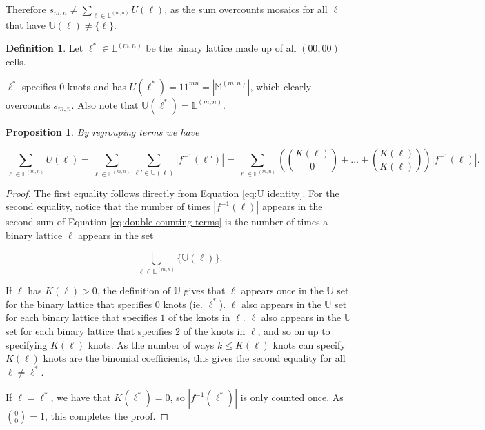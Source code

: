 \documentclass[12pt]{article}
\theoremstyle{plain}
\newtheorem{prop}[thm]{Proposition}
\theoremstyle{definition}
\newtheorem{definition}{Definition}[section]
\theoremstyle{remark}
\theoremstyle{definition}
\begin{document}
Therefore $s_{m,n} \neq \sum_{\ell \in \mathbb{L}^{(m,n)}} U(\ell)$, as the sum overcounts mosaics for all $\ell$ that have $\mathbb{U}(\ell) \neq \{\ell\}$. 

\begin{definition}
    Let $\ell^* \in \mathbb{L}^{(m,n)}$ be the binary lattice made up of all $(00,00)$ cells.
    \label{def:all zeros}
\end{definition}

$\ell^*$ specifies $0$ knots and has $U(\ell^*) = 11^{mn} = \left|\mathbb{M}^{(m,n)}\right|$, which clearly overcounts $s_{m,n}$. Also note that $\mathbb{U}(\ell^*) = \mathbb{L}^{(m,n)}$.


\begin{prop}
    By regrouping terms we have

    \begin{equation}
        \sum_{\ell \in \mathbb{L}^{(m,n)}} U(\ell) = \sum_{\ell \in \mathbb{L}^{(m,n)}}\sum_{\ell' \in \mathbb{U}(\ell)}|f^{-1}(\ell')| = \sum_{\ell \in \mathbb{L}^{(m,n)}} \left(\binom{K(\ell)}{0} + \dots + \binom{K(\ell)}{K(\ell)}\right)|f^{-1}(\ell)|.
        \label{eq:double counting terms}
    \end{equation}
\end{prop}

\begin{proof}
    The first equality follows directly from Equation \ref{eq:U identity}. For the second equality, notice that the number of times $|f^{-1}(\ell)|$ appears in the second sum of Equation \ref{eq:double counting terms} is the number of times a binary lattice $\ell$ appears in the set

    $$\bigcup_{\ell \in \mathbb{L}^{(m,n)}} \{\mathbb{U}(\ell)\}.$$
    
    If $\ell$ has $K(\ell)>0$, the definition of $\mathbb{U}$ gives that $\ell$ appears once in the $\mathbb{U}$ set for the binary lattice that specifies $0$ knots (ie. $\ell^*$). $\ell$ also appears in the $\mathbb{U}$ set for each binary lattice that specifies $1$ of the knots in $\ell$. $\ell$ also appears in the $\mathbb{U}$ set for each binary lattice that specifies $2$ of the knots in $\ell$, and so on up to specifying $K(\ell)$ knots. As the number of ways $k \leq K(\ell)$ knots can specify $K(\ell)$ knots are the binomial coefficients, this gives the second equality for all $\ell \neq \ell^*$.

    If $\ell = \ell^*$, we have that $K(\ell^*)=0$, so $|f^{-1}(\ell^*)|$ is only counted once. As $\binom{0}{0}=1$, this completes the proof.
\end{proof}
\end{document}
